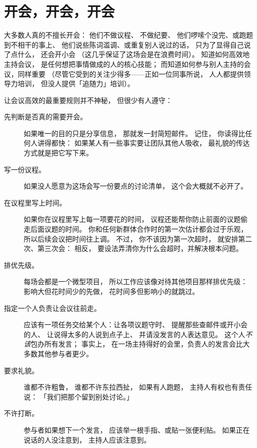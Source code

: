 \chapter{开会，开会，开会}\label{s:meetings}

大多数人真的不擅长开会：
他们不做议程、
不做纪要、
他们啰嗦个没完、或跑题到不相干的事上、
他们说些陈词滥调、或重复别人说过的话，
只为了显得自己说了点什么，
还会开小会
（这几乎保证了这场会是在浪费时间）。
知道如何高效地主持会议，
是任何想把事情做成的人的核心技能；
而知道如何参与别人主持的会议，同样重要
（尽管它受到的关注少得多——正如一位同事所说，
人人都提供领导力培训，
但没人提供「追随力」培训）。

让会议高效的最重要规则并不神秘，
但很少有人遵守：

\begin{description}

\item[先判断是否真的需要开会。]
  如果唯一的目的只是分享信息，
  那就发一封简短邮件。
  记住，
  你读得比任何人讲得都快：
  如果某人有一些事实要让团队其他人吸收，
  最礼貌的传达方式就是把它写下来。

\item[写一份议程。]
  如果没人愿意为这场会写一份要点的讨论清单，
  这个会大概就不必开了。

\item[在议程里写上时间。]
  如果你在议程里写上每一项要花的时间，
  议程还能帮你防止前面的议题偷走后面议题的时间。
  你和任何新群体合作时的第一次估计都会过于乐观，
  所以后续会议把时间往上调。
  不过，
  你不该因为第一次超时，
  就安排第二次、第三次会：
  相反，
  要设法弄清你为什么会超时，并解决根本问题。

\item[排优先级。]
  每场会都是一个微型项目，
  所以工作应该像对待其他项目那样排优先级：
  影响大但花时间少的先做，
  花时间多但影响小的就跳过。

\item[指定一个人负责让会议往前走。]
  应该有一项任务交给某个人：让各项议题守时、
  提醒那些查邮件或开小会的人、
  让说得太多的人说到点子上、
  并请没发言的人表达意见。
  这个人\emph{不该}包办所有发言；
  事实上，
  在一场主持得好的会里，负责人的发言会比大多数其他参与者更少。

\item[要求礼貌。]
  谁都不许粗鲁，
  谁都不许东拉西扯，
  如果有人跑题，
  主持人有权也有责任说：
  「我们把那个留到别处讨论。」

\item[不许打断。]
  参与者如果想下一个发言，
  应该举一根手指、或贴一张便利贴。
  如果正在说话的人没注意到，
  主持人应该注意到。


\end{description}
